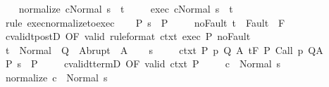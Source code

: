 \begin{isabellebody}
\ \ \isamarkupfalse%
\ {\isachardoublequoteopen}{\isasymGamma}{\isasymturnstile}{\isasymlangle}normalize\ c{\isacharcomma}Normal\ s{\isasymrangle}\ {\isasymRightarrow}\ t{\isachardoublequoteclose}\ \isanewline
\ \ \isamarkupfalse%
\ exec{\isacharcolon}\ {\isachardoublequoteopen}{\isasymGamma}{\isasymturnstile}{\isasymlangle}c{\isacharcomma}Normal\ s{\isasymrangle}\ {\isasymRightarrow}\ t{\isachardoublequoteclose}\ \isanewline
\ \ \ \ \isamarkupfalse%
\ {\isacharparenleft}rule\ exec{\isacharunderscore}normalize{\isacharunderscore}to{\isacharunderscore}exec{\isacharparenright}\isanewline
\ \ \isamarkupfalse%
\ P{\isacharcolon}\ {\isachardoublequoteopen}s\ {\isasymin}\ P{\isachardoublequoteclose}\ \isanewline
\ \ \isamarkupfalse%
\ noFault{\isacharcolon}\ {\isachardoublequoteopen}t\ {\isasymnotin}\ Fault\ {\isacharbackquote}\ F{\isachardoublequoteclose}\isanewline
\ \ \isamarkupfalse%
\ cvalidt{\isacharunderscore}postD\ {\isacharbrackleft}OF\ valid\ {\isacharbrackleft}rule{\isacharunderscore}format{\isacharbrackright}\ ctxt\ exec\ P\ noFault{\isacharbrackright}\isanewline
\ \ \isamarkupfalse%
\ {\isachardoublequoteopen}t\ {\isasymin}\ Normal\ {\isacharbackquote}\ Q\ {\isasymunion}\ Abrupt\ {\isacharbackquote}\ A{\isachardoublequoteclose}\isacommand{{\isachardot}}\isamarkupfalse%
\isanewline
{}\isamarkupfalse%
\isanewline
\ \ \isamarkupfalse%
\ s\ \isanewline
\ \ \isamarkupfalse%
\ ctxt{\isacharcolon}\ {\isachardoublequoteopen}{\isasymforall}{\isacharparenleft}P{\isacharcomma}\ p{\isacharcomma}\ Q{\isacharcomma}\ A{\isacharparenright}{\isasymin}{\isasymTheta}{\isachardot}\ {\isasymGamma}{\isasymTurnstile}\isactrlsub t\isactrlbsub {\isacharslash}F\isactrlesub \ P\ {\isacharparenleft}Call\ p{\isacharparenright}\ Q{\isacharcomma}A{\isachardoublequoteclose}\ \isanewline
\ \ \isamarkupfalse%
\ P{\isacharcolon}\ {\isachardoublequoteopen}s\ {\isasymin}\ P{\isachardoublequoteclose}\ \isanewline
\ \ \isamarkupfalse%
\ cvalidt{\isacharunderscore}termD\ {\isacharbrackleft}OF\ valid\ ctxt\ P{\isacharbrackright}\isanewline
\ \ \isamarkupfalse%
\ {\isachardoublequoteopen}{\isasymGamma}{\isasymturnstile}\ c\ {\isasymdown}\ Normal\ s{\isachardoublequoteclose}\isacommand{{\isachardot}}\isamarkupfalse%
\isanewline
\ \ \isamarkupfalse%
\ {\isachardoublequoteopen}{\isasymGamma}{\isasymturnstile}normalize\ c\ {\isasymdown}\ Normal\ s{\isachardoublequoteclose}\isanewline

\end{isabellebody}
